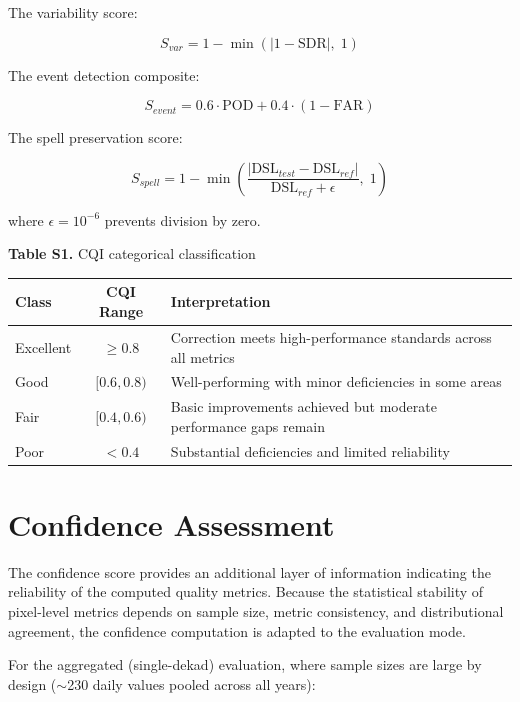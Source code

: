 \documentclass[11pt,a4paper]{article}
\begin{document}
The variability score:

\begin{equation}S_{var} = 1 - \min(|1 - \text{SDR}|, \; 1)\end{equation}

The event detection composite:

\begin{equation}S_{event} = 0.6 \cdot \text{POD} + 0.4 \cdot (1 - \text{FAR})\end{equation}

The spell preservation score:

\begin{equation}S_{spell} = 1 - \min\left(\frac{|\text{DSL}_{test} - \text{DSL}_{ref}|}{\text{DSL}_{ref} + \epsilon}, \; 1\right)\end{equation}

where $\epsilon = 10^{-6}$ prevents division by zero.

\textbf{Table S1.} CQI categorical classification

\begin{longtable}[]{@{}lc>{\raggedright\arraybackslash}p{9cm}@{}}
\toprule
\textbf{Class} & \textbf{CQI Range} & \textbf{Interpretation} \\
\midrule
\endhead
\bottomrule
\endlastfoot
Excellent & $\geq 0.8$ & Correction meets high-performance standards across all metrics \\
Good & $[0.6, 0.8)$ & Well-performing with minor deficiencies in some areas \\
Fair & $[0.4, 0.6)$ & Basic improvements achieved but moderate performance gaps remain \\
Poor & $< 0.4$ & Substantial deficiencies and limited reliability \\
\end{longtable}

\section{Confidence Assessment}\label{sec:s3}

The confidence score provides an additional layer of information indicating the reliability of the computed quality metrics. Because the statistical stability of pixel-level metrics depends on sample size, metric consistency, and distributional agreement, the confidence computation is adapted to the evaluation mode.

For the aggregated (single-dekad) evaluation, where sample sizes are large by design ($\sim$230 daily values pooled across all years):
\end{document}
